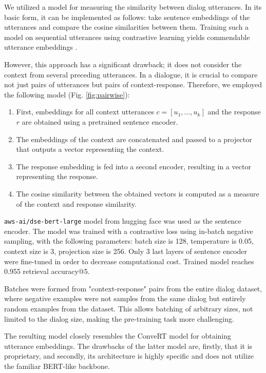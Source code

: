 \documentclass{article}
\begin{document}
We utilized a model for measuring the similarity between dialog utterances. In its basic form, it can be implemented as follows: take sentence embeddings of the utterances and compare the cosine similarities between them. Training such a model on sequential utterances using contrastive learning yields commendable utterance embeddings \cite{Zhou2022}.

However, this approach has a significant drawback; it does not consider the context from several preceding utterances. In a dialogue, it is crucial to compare not just pairs of utterances but pairs of context-response. Therefore, we employed the following model (Fig. \ref{fig:pairwise}):

\begin{enumerate}
    \item  First, embeddings for all context utterances $c=[u_1,\ldots,u_k]$ and the response $r$ are obtained using a pretrained sentence encoder.
    \item The embeddings of the context are concatenated and passed to a projector that outputs a vector representing the context.
    \item The response embedding is fed into a second encoder, resulting in a vector representing the response.
    \item The cosine similarity between the obtained vectors is computed as a measure of the context and response similarity.
\end{enumerate}

\texttt{aws-ai/dse-bert-large} model from hugging face \cite{wolf2020huggingfaces} was used as the sentence encoder. The model was trained with a contrastive loss using in-batch negative sampling, with the following parameters: batch size is 128, temperature is 0.05, context size is 3, projection size is 256. Only 3 last layers of sentence encoder were fine-tuned in order to decrease computational cost. Trained model reaches 0.955 retrieval accuracy@5. 

Batches were formed from "context-response" pairs from the entire dialog dataset, where negative examples were not samples from the same dialog but entirely random examples from the dataset. This allows batching of arbitrary sizes, not limited to the dialog size, making the pre-training task more challenging.

The resulting model closely resembles the ConveRT model \cite{henderson2020convert} for obtaining utterance embeddings. The drawbacks of the latter model are, firstly, that it is proprietary, and secondly, its architecture is highly specific and does not utilize the familiar BERT-like backbone.
\end{document}
